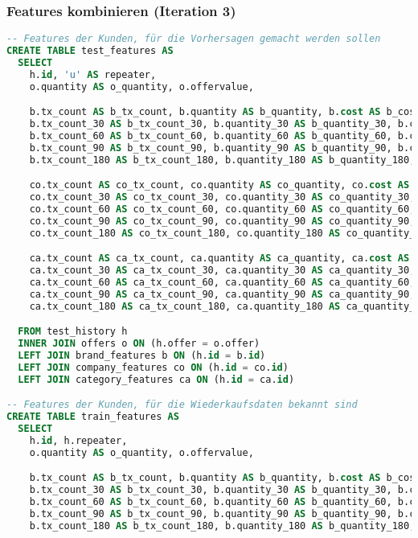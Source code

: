 \subsubsection{Features kombinieren (Iteration 3)}
\label{sql:features_combined_3}
\begin{lstlisting}[language=SQL]
-- Features der Kunden, für die Vorhersagen gemacht werden sollen
CREATE TABLE test_features AS
  SELECT 
    h.id, 'u' AS repeater,
    o.quantity AS o_quantity, o.offervalue,

    b.tx_count AS b_tx_count, b.quantity AS b_quantity, b.cost AS b_cost,
    b.tx_count_30 AS b_tx_count_30, b.quantity_30 AS b_quantity_30, b.cost_30 AS b_cost_30,
    b.tx_count_60 AS b_tx_count_60, b.quantity_60 AS b_quantity_60, b.cost_60 AS b_cost_60,
    b.tx_count_90 AS b_tx_count_90, b.quantity_90 AS b_quantity_90, b.cost_90 AS b_cost_90,
    b.tx_count_180 AS b_tx_count_180, b.quantity_180 AS b_quantity_180, b.cost_180 AS b_cost_180,

    co.tx_count AS co_tx_count, co.quantity AS co_quantity, co.cost AS co_cost,
    co.tx_count_30 AS co_tx_count_30, co.quantity_30 AS co_quantity_30, co.cost_30 AS co_cost_30,
    co.tx_count_60 AS co_tx_count_60, co.quantity_60 AS co_quantity_60, co.cost_60 AS co_cost_60,
    co.tx_count_90 AS co_tx_count_90, co.quantity_90 AS co_quantity_90, co.cost_90 AS co_cost_90,
    co.tx_count_180 AS co_tx_count_180, co.quantity_180 AS co_quantity_180, co.cost_180 AS co_cost_180,

    ca.tx_count AS ca_tx_count, ca.quantity AS ca_quantity, ca.cost AS ca_cost,
    ca.tx_count_30 AS ca_tx_count_30, ca.quantity_30 AS ca_quantity_30, ca.cost_30 AS ca_cost_30,
    ca.tx_count_60 AS ca_tx_count_60, ca.quantity_60 AS ca_quantity_60, ca.cost_60 AS ca_cost_60,
    ca.tx_count_90 AS ca_tx_count_90, ca.quantity_90 AS ca_quantity_90, ca.cost_90 AS ca_cost_90,
    ca.tx_count_180 AS ca_tx_count_180, ca.quantity_180 AS ca_quantity_180, ca.cost_180 AS ca_cost_180

  FROM test_history h
  INNER JOIN offers o ON (h.offer = o.offer)
  LEFT JOIN brand_features b ON (h.id = b.id)
  LEFT JOIN company_features co ON (h.id = co.id)
  LEFT JOIN category_features ca ON (h.id = ca.id)

-- Features der Kunden, für die Wiederkaufsdaten bekannt sind
CREATE TABLE train_features AS
  SELECT 
    h.id, h.repeater,
    o.quantity AS o_quantity, o.offervalue,

    b.tx_count AS b_tx_count, b.quantity AS b_quantity, b.cost AS b_cost,
    b.tx_count_30 AS b_tx_count_30, b.quantity_30 AS b_quantity_30, b.cost_30 AS b_cost_30,
    b.tx_count_60 AS b_tx_count_60, b.quantity_60 AS b_quantity_60, b.cost_60 AS b_cost_60,
    b.tx_count_90 AS b_tx_count_90, b.quantity_90 AS b_quantity_90, b.cost_90 AS b_cost_90,
    b.tx_count_180 AS b_tx_count_180, b.quantity_180 AS b_quantity_180, b.cost_180 AS b_cost_180,


\end{lstlisting}
